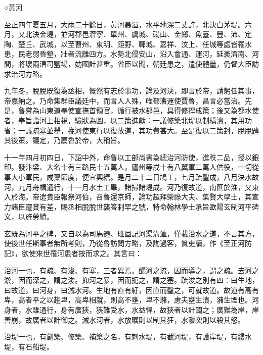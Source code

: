 
\begin{pinyinscope}

 ○黃河



 至正四年夏五月，大雨二十餘日，黃河暴溢，水平地深二丈許，北決白茅堤。六月，又北決金堤，並河郡邑濟寧、單州、虞城、碭山、金鄉、魚臺、豐、沛、定陶、楚丘、武城，以至曹州、東明、鉅野、鄆城、嘉祥、汶上、任城等處皆罹水患，民老弱昏墊，壯者流離四方。水勢北侵安山，沿入會通、運河，延袤濟南、河間，將壞兩漕司鹽場，妨國計甚重。省臣以聞，朝廷患之，遣使體量，仍督大臣訪求治河方略。



 九年冬，脫脫既復為丞相，慨然有志於事功，論及河決，即言於帝，請躬任其事，帝嘉納之。乃命集群臣議廷中，而言人人殊，唯都漕運使賈魯，昌言必當治。先是，魯嘗為山東道奉使宣撫首領官，循行被水郡邑，具得修捍成策；後又為都水使者，奉旨詣河上相視，驗狀為圖，以二策進獻：一議修築北堤以制橫潰，其用功省；一議疏塞並舉，挽河使東行以復故道，其功費甚大。至是復以二策封，脫脫韙其後策。議定，乃薦魯於帝，大稱旨。



 十一年四月初四日，下詔中外，命魯以工部尚書為總治河防使，進秩二品，授以銀印。發汴梁、大名十有三路民十五萬人，廬州等戍十有八翼軍二萬人供役，一切從事大小軍民，咸稟節度，便宜興繕。是月二十二日鳩工，七月疏鑿成，八月決水故河，九月舟楫通行，十一月水土工畢，諸掃諸堤成。河乃復故道，南匯於淮，又東入於海。帝遣貴臣報祭河伯，召魯還京師，論功超拜榮祿大夫、集賢大學士，其宣力諸臣遷賞有差，賜丞相脫脫世襲答剌罕之號，特命翰林學士承旨歐陽玄制河平碑文，以旌勞績。



 玄既為河平之碑，又自以為司馬遷、班固記河渠溝洫，僅載治水之道，不言其方，使後世任斯事者無所考則，乃從魯訪問方略，及詢過客，質吏牘，作《至正河防記》，欲使來世罹河患者按而求之。其言曰：



 治河一也，有疏、有浚、有塞，三者異焉。釃河之流，因而導之，謂之疏。去河之淤，因而深之，謂之浚。抑河之暴，因而扼之，謂之塞。疏浚之別有四：曰生地，曰故道，曰河身，曰減水河。生地有直有紆，因直而鑿之，可就故道。故道有高有卑，高者平之以趨卑，高卑相就，則高不壅，卑不瀦，慮夫壅生潰，瀦生堙也。河身者，水雖通行，身有廣狹，狹難受水，水益悍，故狹者以計闢之；廣難為岸，岸善崩，故廣者以計御之。減水河者，水放曠則以制其狂，水隳突則以殺其怒。



 治堤一也，有創築、修築、補築之名，有剌水堤，有截河堤，有護岸堤，有縷水堤，有石船堤。




\end{pinyinscope}
